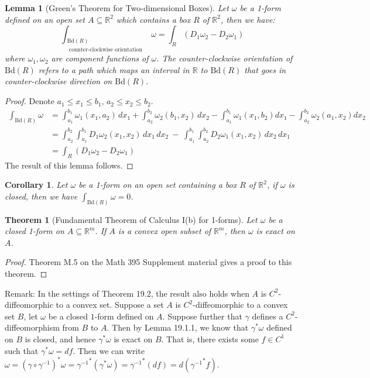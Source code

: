 \documentclass[11pt,oneside]{book}
\theoremstyle{break}
\theoremstyle{break}
\newtheorem{thm}{Theorem}[section]
\newtheorem{lem}{Lemma}[thm]
\newtheorem{corL}{Corollary}[lem]
\newcommand{\R}{\mathbb{R}}
\newcommand{\Bd}{\text{Bd}}
\newcommand{\remark}{\color{blue}Remark: \color{black}}
\begin{document}
\begin{lem}[Green's Theorem for Two-dimensional Boxes]
Let $\omega$ be a 1-form defined on an open set $A\subseteq \R^2$ which contains a box $R$ of $\R^2$, then we have: 
$$\int_{\substack{{\Bd(R)}\\ \text{ counter-clockwise orientation}}} \omega = \int_R (D_1\omega_2 - D_2\omega_1)$$ 
where $\omega_1,\omega_2$ are component functions of $\omega$. The counter-clockwise orientation of $\Bd(R)$ refers to a path which maps an interval in $\R$ to $\Bd(R)$ that goes in counter-clockwise direction on $\Bd(R)$.
\end{lem}
\begin{proof}
Denote $a_1\leq x_1\leq b_1$, $a_2\leq x_2\leq b_2$. 
\begin{align*}
\int_{\Bd(R)}\omega &= \int_{a_1}^{b_1}\omega_1(x_1,a_2)\, dx_1+\int_{a_2}^{b_2}\omega_2(b_1,x_2)\, dx_2 -\int_{a_1}^{b_1} \omega_1 (x_1,b_2)dx_1 - \int_{a_2}^{b_2} \omega_2(a_1,x_2)dx_2\\
&= \int_{a_2}^{b_2}\int_{a_1}^{b_1} D_1\omega_2(x_1,x_2)\,dx_1\, dx_2 \ -\  \int_{a_1}^{b_1}\int_{a_2}^{b_2} D_2\omega_1(x_1,x_2)\,dx_2\,dx_1\\
&= \int_R (D_1\omega_2 - D_2\omega_1)
\end{align*}
The result of this lemma follows.
\end{proof}

\begin{corL}
Let $\omega$ be a 1-form on an open set containing a box $R$ of $\R^2$, if $\omega$ is closed, then we have $\int_{\Bd(R)}\omega = 0$. 
\end{corL}


\begin{thm}[Fundamental Theorem of Calculus I(b) for 1-forms]
Let $\omega$ be a closed 1-form on $A\subseteq \R^m$. If $A$ is a convex open subset of $\R^m$, then  $\omega$ is exact on $A$.  
\end{thm}
\begin{proof}
Theorem M.5 on the Math 395 Supplement material gives a proof to this theorem.
\end{proof}

\remark In the settings of Theorem 19.2, the result also holds when $A$ is $C^2$-diffeomorphic to a convex set. Suppose a set $A$ is $C^2$-diffeomorphic to a convex set $B$, let $\omega$ be a closed $1$-form defined on $A$. Suppose further that $\gamma$ defines a $C^2$-diffeomorphism from $B$ to $A$. Then by Lemma 19.1.1, we know that $\gamma^*\omega$ defined on $B$ is closed, and hence $\gamma^*\omega$ is exact on $B$. That is, there exists some $f \in C^1$ such that $\gamma^*\omega  = df$. Then we can write $\omega = (\gamma\circ \gamma^{-1})^*\omega  = {\gamma^{-1}}^*(\gamma^*\omega) = {\gamma^{-1}}^*(df) = d({\gamma^{-1}}^*f)$.\\
\end{document}
